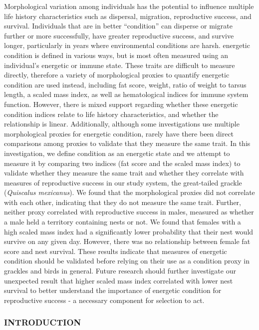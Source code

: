 \documentclass[
]{article}
\begin{document}
Morphological variation among individuals has the potential to influence
multiple life history characteristics such as dispersal, migration,
reproductive success, and survival. Individuals that are in better
``condition'' can disperse or migrate further or more successfully, have
greater reproductive success, and survive longer, particularly in years
where environmental conditions are harsh. energetic condition is defined
in various ways, but is most often measured using an individual's
energetic or immune state. These traits are difficult to measure
directly, therefore a variety of morphological proxies to quantify
energetic condition are used instead, including fat score, weight, ratio
of weight to tarsus length, a scaled mass index, as well as
hematological indices for immune system function. However, there is
mixed support regarding whether these energetic condition indices relate
to life history characteristics, and whether the relationship is linear.
Additionally, although some investigations use multiple morphological
proxies for energetic condition, rarely have there been direct
comparisons among proxies to validate that they measure the same trait.
In this investigation, we define condition as an energetic state and we
attempt to measure it by comparing two indices (fat score and the scaled
mass index) to validate whether they measure the same trait and whether
they correlate with measures of reproductive success in our study
system, the great-tailed grackle (\emph{Quiscalus mexicanus}). We found
that the morphological proxies did not correlate with each other,
indicating that they do not measure the same trait. Further, neither
proxy correlated with reproductive success in males, measured as whether
a male held a territory containing nests or not. We found that females
with a high scaled mass index had a significantly lower probability that
their nest would survive on any given day. However, there was no
relationship between female fat score and nest survival. These results
indicate that measures of energetic condition should be validated before
relying on their use as a condition proxy in grackles and birds in
general. Future research should further investigate our unexpected
result that higher scaled mass index correlated with lower nest survival
to better understand the importance of energetic condition for
reproductive success - a necessary component for selection to act.

\hypertarget{introduction}{%
\subsubsection{INTRODUCTION}\label{introduction}}
\end{document}
